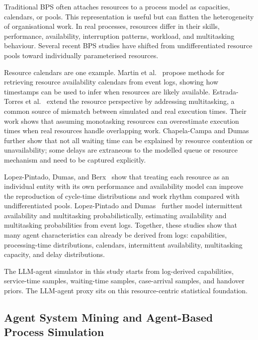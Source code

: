 Traditional BPS often attaches resources to a process model as
capacities, calendars, or pools. This representation is useful but can
flatten the heterogeneity of organisational work. In real processes,
resources differ in their skills, performance, availability,
interruption patterns, workload, and multitasking behaviour. Several
recent BPS studies have shifted from undifferentiated resource pools
toward individually parameterised resources.

Resource calendars are one example. Martin et al.~\cite{martin2020calendars} propose methods
for retrieving resource availability calendars from event logs, showing
how timestamps can be used to infer when resources are likely available.
Estrada-Torres et al.~\cite{estrada2020multitasking} extend the resource perspective by
addressing multitasking, a common source of mismatch between simulated
and real execution times. Their work shows that assuming monotasking
resources can overestimate execution times when real resources handle
overlapping work. Chapela-Campa and Dumas~\cite{chapela2024extraneous} further show that not
all waiting time can be explained by resource contention or
unavailability; some delays are extraneous to the modelled queue or
resource mechanism and need to be captured explicitly.

Lopez-Pintado, Dumas, and Berx~\cite{lopezpintado2024differentiated} show
that treating each resource as an individual entity with its own
performance and availability model can improve the reproduction of
cycle-time distributions and work rhythm compared with undifferentiated
pools. Lopez-Pintado and Dumas~\cite{lopezpintado2025probabilistic} further model intermittent
availability and multitasking probabilistically, estimating availability
and multitasking probabilities from event logs. Together, these studies
show that many agent characteristics can already be derived from logs:
capabilities, processing-time distributions, calendars, intermittent
availability, multitasking capacity, and delay distributions.

The LLM-agent simulator in this study starts from log-derived
capabilities, service-time samples, waiting-time samples, case-arrival
samples, and handover priors.
The LLM-agent proxy sits on this resource-centric statistical
foundation.

\subsection{Agent System Mining and Agent-Based Process
Simulation}\label{agent-system-mining-and-agent-based-process-simulation}

